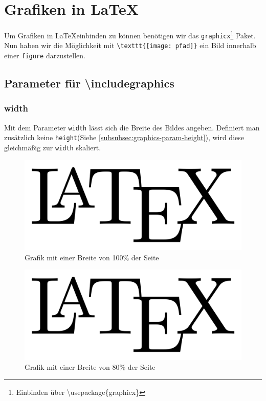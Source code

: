 \documentclass[
12pt,
ngerman
]{scrreprt}
\begin{document}
\newpage
\section{Grafiken in \LaTeX}
\label{sec:graphics}
Um Grafiken in \LaTeX einbinden zu können benötigen wir das \verb!graphicx!\footnote{Einbinden über \textbackslash usepackage\{graphicx\}} Paket. Nun haben wir die Möglichkeit mit \verb!\texttt{[image: pfad]}! ein Bild innerhalb einer \verb!figure! darzustellen.

\subsection{Parameter für \textbackslash includegraphics}
\label{subsec:graphics-param}

\subsubsection{width}
\label{subsubsec:graphics-param-width}
Mit dem Parameter \verb!width! lässt sich die Breite des Bildes angeben. Definiert man zusätzlich keine \verb!height!(Siehe \vref{subsubsec:graphics-param-height}), wird diese gleichmäßig zur \verb!width! skaliert.
\begin{figure} [hbt!]
  \centering
  \includegraphics[width=\linewidth]{img/latex-logo}
  \caption{Grafik mit einer Breite von 100\% der Seite}
  \label{fig:graphics-param-width-1}
\end{figure}
\begin{figure} [hbt!]
  \centering
  \includegraphics[width=0.8\linewidth]{img/latex-logo}
  \caption{Grafik mit einer Breite von 80\% der Seite}
  \label{fig:graphics-param-width-2}
\end{figure}
\end{document}

